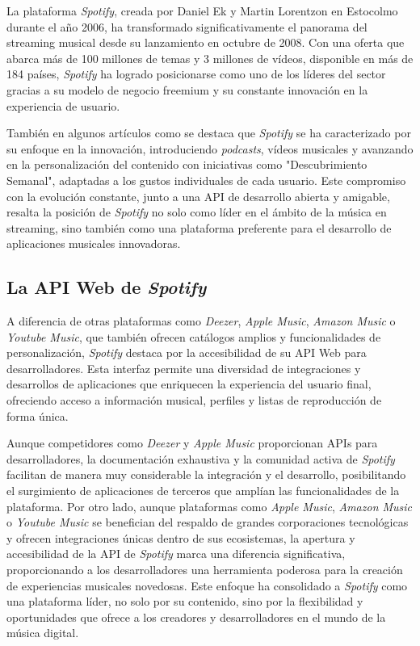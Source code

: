 La plataforma \textit{Spotify}, creada por Daniel Ek y Martin Lorentzon en Estocolmo durante el año 2006, ha transformado significativamente el panorama del 
streaming musical desde su lanzamiento en octubre de 2008. Con una oferta que abarca más de 100 millones de temas y 3 millones de vídeos, disponible 
en más de 184 países, \textit{Spotify} ha logrado posicionarse como uno de los líderes del sector gracias a su modelo de negocio freemium y su constante innovación 
en la experiencia de usuario. \cite{spotify_wikipedia}

También en algunos artículos como \cite{HistoriaSpotifyMarketing4ECommerce} se destaca que \textit{Spotify} se ha caracterizado por su enfoque en la innovación, introduciendo 
\textit{podcasts}, vídeos musicales y avanzando en la personalización del contenido con iniciativas 
como "Descubrimiento Semanal", adaptadas a los gustos individuales de cada usuario. Este compromiso con la evolución constante, junto a una API de desarrollo abierta y amigable, 
resalta la posición de \textit{Spotify} no solo como líder en el ámbito de la música en streaming, sino también como una plataforma preferente para el desarrollo de aplicaciones 
musicales innovadoras.

\subsection{La API Web de \textit{Spotify}\label{SEC:API_SPOTIFY_EA}}

A diferencia de otras plataformas como \textit{Deezer}, \textit{Apple Music}, \textit{Amazon Music} o \textit{Youtube Music}, que también ofrecen catálogos amplios y funcionalidades de personalización, 
\textit{Spotify} destaca por la accesibilidad de su API Web para desarrolladores. Esta interfaz permite una diversidad de integraciones y desarrollos de aplicaciones 
que enriquecen la experiencia del usuario final, ofreciendo acceso a información musical, perfiles y listas de reproducción de forma única.

Aunque competidores como \textit{Deezer} \cite{deezer_api} y \textit{Apple Music} \cite{applemusic_api} proporcionan APIs para desarrolladores, la documentación exhaustiva y la comunidad activa de \textit{Spotify} facilitan 
de manera muy considerable la integración y el desarrollo, posibilitando el surgimiento de aplicaciones de terceros que amplían las funcionalidades de la plataforma.
Por otro lado, aunque plataformas como \textit{Apple Music}, \textit{Amazon Music} o \textit{Youtube Music} se benefician del respaldo de grandes corporaciones tecnológicas y ofrecen integraciones únicas 
dentro de sus ecosistemas, la apertura y accesibilidad de la API de \textit{Spotify} marca una diferencia significativa, proporcionando a los desarrolladores una herramienta
 poderosa para la creación de experiencias musicales novedosas. Este enfoque ha consolidado a \textit{Spotify} como una plataforma líder, no solo por su contenido, sino por 
 la flexibilidad y oportunidades que ofrece a los creadores y desarrolladores en el mundo de la música digital.

